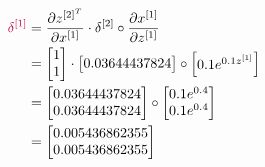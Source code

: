 \documentclass[12pt]{article}
\begin{document}
\begin{enumerate}[leftmargin=\labelsep]
        \begin{equation*}
          \begin{aligned}
            \textcolor{purple}{\delta^{[1]}} & = \frac{\partial z^{[2]^T}}{\partial x^{[1]}} \cdot \delta^{[2]} \circ \frac{\partial x^{[1]}}{\partial z^{[1]}} \\
                                             & = \begin{bmatrix}
                                                   1 \\
                                                   1
                                                 \end{bmatrix} \cdot \begin{bmatrix}
                                                                       0.03644437824
                                                                     \end{bmatrix} \circ \begin{bmatrix}
                                                                                           0.1e^{0.1z^{[1]}}
                                                                                         \end{bmatrix}                   \\
                                             & = \begin{bmatrix}
                                                   0.03644437824 \\
                                                   0.03644437824
                                                 \end{bmatrix} \circ \begin{bmatrix}
                                                                       0.1 e^{0.4} \\
                                                                       0.1 e^{0.4}
                                                                     \end{bmatrix}                                                                             \\
                                             & = \begin{bmatrix}
                                                   0.005436862355 \\
                                                   0.005436862355
                                                 \end{bmatrix}
          \end{aligned}
        \end{equation*}


\end{enumerate}
\end{document}
